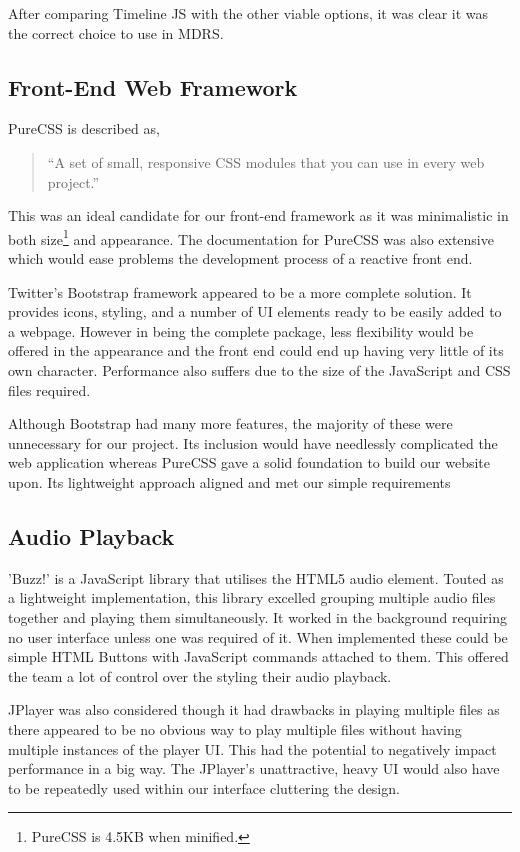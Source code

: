 \documentclass{l3proj}
\begin{document}
After comparing Timeline JS with the other viable options, it was clear it was the correct choice to use in MDRS.

\subsection{Front-End Web Framework}

PureCSS\cite{pureCSS} is described as,

\blockquote{“A set of small, responsive CSS modules that you can use in every web project.”}

This was an ideal candidate for our front-end framework as it was minimalistic in both size\footnote{PureCSS is 4.5KB when minified.} and appearance. The documentation for PureCSS was also extensive which would  ease problems the development process of a reactive front end.

Twitter's Bootstrap framework appeared to be a more complete solution. It provides icons, styling, and a number of UI elements ready to be easily added to a webpage. However in being the complete package, less flexibility would be offered in the appearance and the front end could end up having very little of its own character. Performance also suffers due to the size of the \gls{JavaScript} and CSS files required.

Although Bootstrap\cite{bootstrap} had many more features, the majority of these were unnecessary for our project. Its inclusion would have needlessly complicated the web application whereas PureCSS gave a solid foundation to build our website upon. Its lightweight approach aligned and met our simple requirements


\subsection{Audio Playback}

'Buzz!'\cite{buzz} is a \gls{JavaScript} library that utilises the HTML5 audio element. Touted as a lightweight implementation, this library excelled grouping multiple audio files together and playing them simultaneously. It worked in the background requiring no user interface unless one was required of it. When implemented these could be simple \gls{HTML} Buttons with JavaScript commands attached to them. This offered the team a lot of control over the styling their audio playback.

JPlayer\cite{JPlayer} was also considered though it had drawbacks in playing multiple files as there appeared to be no obvious way to play multiple files without having multiple instances of the player UI. This had the potential to negatively impact performance in a big way. The JPlayer's unattractive, heavy UI would also have to be repeatedly used within our interface cluttering the design.
\end{document}
